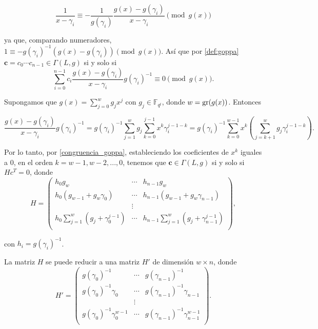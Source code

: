 \[
    \frac{1}{x - \gamma_i} \equiv - \frac{1}{g(\gamma_i)} \frac{g(x) - g(\gamma_i)}{x - \gamma_i} \pmod{ g(x)}
\]

ya que, comparando numeradores, $1 \equiv - g(\gamma_i)^{-1} \left( g(x) - g(\gamma_i) \right) \pmod{g(x)}$. Así que por \eqref{def:goppa} $\textbf{c} = c_0 \cdots c_{n-1} \in \Gamma(L,g)$ si y solo si
\begin{equation}
    \label{congruencia_goppa}
    \sum_{i=0}^{n-1} c_i \frac{g(x) - g(\gamma_i)}{x - \gamma_i} g(\gamma_i)^{-1} \equiv 0 \pmod{g(x)}.
\end{equation}

Supongamos que $g(x) = \sum_{j=0}^w g_j x^j$ con $g_j \in \mathbb{F}_{q^t}$, donde $w = \operatorname{gr}(g(x))$. Entonces

\[
    \frac{g(x) - g(\gamma_i)}{x - \gamma_i} g(\gamma_i)^{-1} = g(\gamma_i)^{-1} \sum_{j=1}^w g_j \sum_{k=0}^{j-1} x^k \gamma_i^{j-1-k} = g(\gamma_i)^{-1} \sum_{k=0}^{w-1} x^k \left( \sum_{j=k+1}^w g_j \gamma_i^{j-1-k} \right).
\]

Por lo tanto, por \eqref{congruencia_goppa}, estableciendo los coeficientes de $x^k$ iguales a $0$, en el orden $k = w - 1, w - 2, ..., 0$, tenemos que $\textbf{c} \in \Gamma(L,g)$ si y solo si $Hc^T = 0$, donde 
\begin{equation}
    H = \left(
        \begin{array}{ccc} 
            h_0 g_w & \cdots & h_{n-1} g_w  \\
            h_0 (g_{w-1} + g_w \gamma_0) & \cdots & h_{n-1} (g_{w-1} + g_w \gamma_{n-1}) \\
            & \vdots & \\
            h_0 \sum_{j=1}^w \left( g_j + \gamma_0^{j-1} \right) & \cdots & h_{n-1} \sum_{j=1}^w \left( g_{j} + \gamma_{n-1}^{j-1} \right) \\
        \end{array}
        \right),
\end{equation}

con $h_i = g(\gamma_i)^{-1}$.


\begin{proposition}
    La matriz $H$ se puede reducir a una matriz $H'$ de dimensión $w \times n$, donde 
    \begin{equation}
        H' = \left(
            \begin{array}{ccc} 
                g(\gamma_0)^{-1} & \cdots & g(\gamma_{n-1})^{-1}  \\
                g(\gamma_0)^{-1} \gamma_0 & \cdots & g(\gamma_{n-1})^{-1} \gamma_{n-1} \\
                & \vdots & \\
                g(\gamma_0)^{-1} \gamma_0^{w-1} & \cdots & g(\gamma_{n-1})^{-1} \gamma_{n-1}^{w-1} \\
            \end{array}
            \right).
    \end{equation}
\end{proposition}

